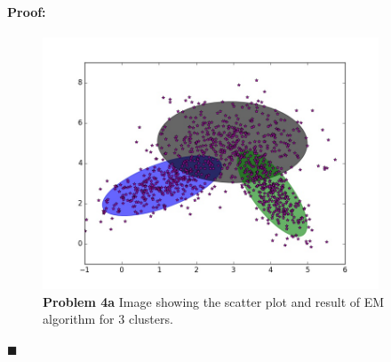 \documentclass[12pt]{article}
\newenvironment{proof}{\paragraph{Proof: }}{\hfill$\blacksquare$}
\begin{document}
\begin{proof}
\begin{enumerate}
\begin{figure}[!htbp]
\centering
\includegraphics[width = 10cm]{prob4a_k3.jpg}
\caption{\textbf{Problem 4a} Image showing the scatter plot and result of EM algorithm for 3 clusters.}
\end{figure}


\end{enumerate}
\end{proof}
\end{document}
